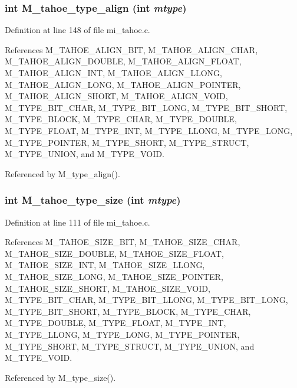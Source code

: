 \subsubsection{\setlength{\rightskip}{0pt plus 5cm}int M\_\-tahoe\_\-type\_\-align (int {\em mtype})}\label{m__tahoe_8h_fd9875093aee6434bea63d135da74db9}




Definition at line 148 of file mi\_\-tahoe.c.

References M\_\-TAHOE\_\-ALIGN\_\-BIT, M\_\-TAHOE\_\-ALIGN\_\-CHAR, M\_\-TAHOE\_\-ALIGN\_\-DOUBLE, M\_\-TAHOE\_\-ALIGN\_\-FLOAT, M\_\-TAHOE\_\-ALIGN\_\-INT, M\_\-TAHOE\_\-ALIGN\_\-LLONG, M\_\-TAHOE\_\-ALIGN\_\-LONG, M\_\-TAHOE\_\-ALIGN\_\-POINTER, M\_\-TAHOE\_\-ALIGN\_\-SHORT, M\_\-TAHOE\_\-ALIGN\_\-VOID, M\_\-TYPE\_\-BIT\_\-CHAR, M\_\-TYPE\_\-BIT\_\-LONG, M\_\-TYPE\_\-BIT\_\-SHORT, M\_\-TYPE\_\-BLOCK, M\_\-TYPE\_\-CHAR, M\_\-TYPE\_\-DOUBLE, M\_\-TYPE\_\-FLOAT, M\_\-TYPE\_\-INT, M\_\-TYPE\_\-LLONG, M\_\-TYPE\_\-LONG, M\_\-TYPE\_\-POINTER, M\_\-TYPE\_\-SHORT, M\_\-TYPE\_\-STRUCT, M\_\-TYPE\_\-UNION, and M\_\-TYPE\_\-VOID.

Referenced by M\_\-type\_\-align().
\subsubsection{\setlength{\rightskip}{0pt plus 5cm}int M\_\-tahoe\_\-type\_\-size (int {\em mtype})}\label{m__tahoe_8h_bfa07e005fe8c5bae9b7f368ba970f78}




Definition at line 111 of file mi\_\-tahoe.c.

References M\_\-TAHOE\_\-SIZE\_\-BIT, M\_\-TAHOE\_\-SIZE\_\-CHAR, M\_\-TAHOE\_\-SIZE\_\-DOUBLE, M\_\-TAHOE\_\-SIZE\_\-FLOAT, M\_\-TAHOE\_\-SIZE\_\-INT, M\_\-TAHOE\_\-SIZE\_\-LLONG, M\_\-TAHOE\_\-SIZE\_\-LONG, M\_\-TAHOE\_\-SIZE\_\-POINTER, M\_\-TAHOE\_\-SIZE\_\-SHORT, M\_\-TAHOE\_\-SIZE\_\-VOID, M\_\-TYPE\_\-BIT\_\-CHAR, M\_\-TYPE\_\-BIT\_\-LLONG, M\_\-TYPE\_\-BIT\_\-LONG, M\_\-TYPE\_\-BIT\_\-SHORT, M\_\-TYPE\_\-BLOCK, M\_\-TYPE\_\-CHAR, M\_\-TYPE\_\-DOUBLE, M\_\-TYPE\_\-FLOAT, M\_\-TYPE\_\-INT, M\_\-TYPE\_\-LLONG, M\_\-TYPE\_\-LONG, M\_\-TYPE\_\-POINTER, M\_\-TYPE\_\-SHORT, M\_\-TYPE\_\-STRUCT, M\_\-TYPE\_\-UNION, and M\_\-TYPE\_\-VOID.

Referenced by M\_\-type\_\-size().
